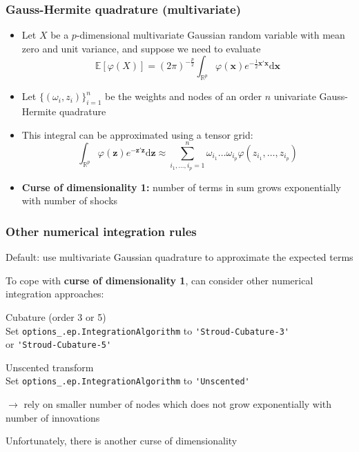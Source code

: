\documentclass[handout,usepdftitle=false,xcolor=dvipsnames,aspectratio=169]{beamer}
\begin{document}
\begin{frame}
  \frametitle{Gauss-Hermite quadrature (multivariate)}
  \begin{itemize}
    \item Let $X$ be a $p$-dimensional multivariate Gaussian random variable with mean zero and unit variance, and suppose we need to evaluate
            {\small\begin{equation}
                \mathbb E [\varphi(X)] =  (2\pi)^{-\frac{p}{2}}\int_{\mathbb R^{p}} \varphi(\mathbf{x})e^{-\frac{1}{2} \mathbf{x}'\mathbf{x}}\mathrm d\mathbf{x}
              \end{equation}
            }
    \item Let $\{(\omega_i,z_i)\}_{i=1}^n$ be the weights and nodes of an order $n$ univariate Gauss-Hermite quadrature
    \item This integral can be approximated using a tensor grid:
          {\small\begin{equation}
            \int_{\mathbb R^{p}} \varphi(\mathbf{z})e^{-\mathbf{z}'\mathbf{z}}\mathrm d\mathbf{z} \approx \sum_{i_1,\dots,i_p=1}^n\omega_{i_1}\dots\omega_{i_p} \varphi(z_{i_1},\dots,z_{i_p})
          \end{equation}
          }
    \item \textbf{Curse of dimensionality 1:} number of terms in
          sum grows exponentially with number of shocks
  \end{itemize}
\end{frame}

\begin{frame}[fragile]
  \frametitle{Other numerical integration rules}
  \begin{witemize}
    \item Default: use multivariate Gaussian quadrature to approximate the expected terms
    \item To cope with \textbf{curse of dimensionality 1}, can consider other numerical integration approaches:
    \begin{witemize}
      \item[--] Cubature (order 3 or 5)\\
            Set \verb+options_.ep.IntegrationAlgorithm+ to \verb+'Stroud-Cubature-3'+\\
            or \verb+'Stroud-Cubature-5'+
      \item[--] Unscented transform\\
            Set \verb+options_.ep.IntegrationAlgorithm+ to \verb+'Unscented' +
    \end{witemize}
    $\rightarrow$ rely on smaller number of nodes which does
    not grow exponentially with number of innovations
    \item Unfortunately, there is another curse of dimensionality
  \end{witemize}
\end{frame}
\end{document}
